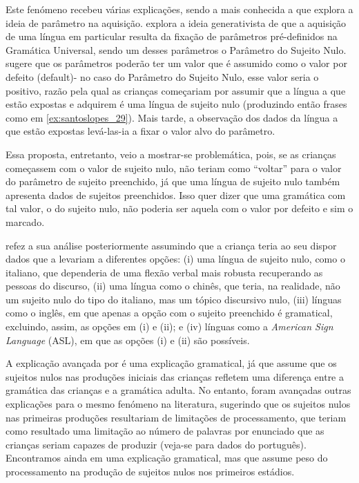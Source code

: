 \documentclass[output=paper]{LSP/langsci}
\begin{document}
Este fenómeno recebeu várias explicações, sendo a mais conhecida a que explora a ideia de parâmetro na aquisição. \citet{hyams1986} explora a ideia generativista de que a aquisição de uma língua em particular resulta da fixação de parâmetros pré-definidos na Gramática Universal, sendo um desses parâmetros o Parâmetro do Sujeito Nulo. \citeauthor{hyams1986} sugere que os parâmetros poderão ter um valor que é assumido como o valor por defeito (default)- no caso do Parâmetro do Sujeito Nulo, esse valor seria o positivo, razão pela qual as crianças começariam por assumir que a língua a que estão expostas e adquirem é uma língua de sujeito nulo (produzindo então frases como em \ref{ex:santoslopes_29}). Mais tarde, a observação dos dados da língua a que estão expostas levá-las-ia a fixar o valor alvo do parâmetro.

Essa proposta, entretanto, veio a mostrar-se problemática, pois, se as crianças   começassem com o valor de sujeito nulo, não teriam como “voltar” para o valor do parâmetro de sujeito preenchido, já que uma língua de sujeito nulo também apresenta dados de sujeitos preenchidos. Isso quer dizer que uma gramática com tal valor, o do sujeito nulo, não poderia ser aquela com o valor por defeito e sim o marcado.

\citet{hyams1991} refez a sua análise posteriormente assumindo que a criança teria ao seu dispor dados que a levariam a diferentes opções: (i) uma língua de sujeito nulo, como o italiano, que dependeria de uma flexão verbal mais robusta recuperando as pessoas do discurso, (ii) uma língua como o chinês, que teria, na realidade, não um sujeito nulo do tipo do italiano, mas um tópico discursivo nulo, (iii) línguas como o inglês, em que apenas a opção com o sujeito preenchido é gramatical, excluindo, assim, as opções em (i) e (ii); e (iv) línguas como a \textit{American Sign Language} (ASL), em que as opções (i) e (ii) são possíveis. 

A explicação avançada por \citeauthor{hyams1986} é uma explicação gramatical, já que assume que os sujeitos nulos nas produções iniciais das crianças refletem uma diferença entre a gramática das crianças e a gramática adulta. No entanto, foram avançadas outras explicações para o mesmo fenómeno na literatura, sugerindo que os sujeitos nulos nas primeiras produções resultariam de limitações de processamento, que teriam como resultado uma limitação ao número de palavras por enunciado que as crianças seriam capazes de produzir (veja-se \citealt{bloom1990,valianeisenberg} para dados do português). Encontramos ainda em \citet{rizzi2000,rizzi2005} uma explicação gramatical, mas que assume peso do processamento na produção de sujeitos nulos nos primeiros estádios.
\end{document}
